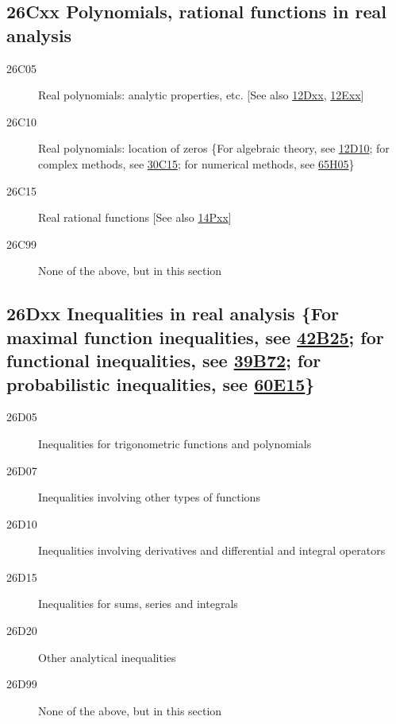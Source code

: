 \subsection*{26Cxx  Polynomials, rational functions in real analysis}\label{26Cxx}
\begin{description}
\item [26C05]\label{26C05} Real polynomials: analytic properties, etc. [See also \hyperref[12Dxx]{12Dxx}, \hyperref[12Exx]{12Exx}]
\item [26C10]\label{26C10} Real polynomials: location of zeros \{For algebraic theory, see \hyperref[12D10]{12D10}; for complex methods, see \hyperref[30C15]{30C15}; for numerical methods, see \hyperref[65H05]{65H05}\}
\item [26C15]\label{26C15} Real rational functions [See also \hyperref[14Pxx]{14Pxx}]
\item [26C99]\label{26C99} None of the above, but in this section
\end{description}
\subsection*{26Dxx  Inequalities in real analysis \{For maximal function inequalities, see \hyperref[42B25]{42B25}; for functional inequalities, see \hyperref[39B72]{39B72}; for probabilistic inequalities, see \hyperref[60E15]{60E15}\} }\label{26Dxx}
\begin{description} 
\item [26D05]\label{26D05} Inequalities for trigonometric functions and polynomials
\item [26D07]\label{26D07} Inequalities involving other types of functions
\item [26D10]\label{26D10} Inequalities involving derivatives and differential and integral operators
\item [26D15]\label{26D15} Inequalities for sums, series and integrals
\item [26D20]\label{26D20} Other analytical inequalities
\item [26D99]\label{26D99} None of the above, but in this section
\end{description}
